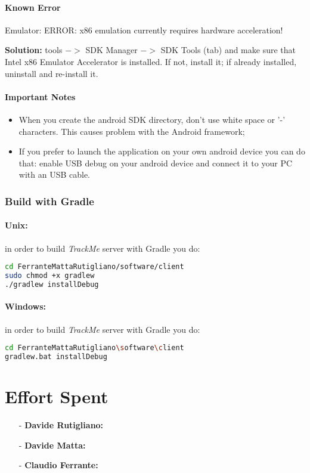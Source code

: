 \documentclass[a4paper]{article}
\begin{document}
\paragraph{Known Error}
Emulator: ERROR: x86 emulation currently requires hardware acceleration!

\textbf{Solution:} tools ${->}$ SDK Manager ${->}$ SDK Tools (tab) and make sure that Intel x86 Emulator Accelerator is installed. If not, install it; if already installed, uninstall and re-install it.

\paragraph{Important Notes}
\begin{itemize}
    \item When you create the android SDK directory, don't use white space or '-' characters. This causes problem with the Android framework;
    \item If you prefer to launch the application on your own android device you can do that: enable USB debug on your android device and connect it to your PC with an USB cable.
\end{itemize}

\subsubsection{Build with Gradle}

\paragraph{Unix:} in order to build \textit{TrackMe} server with Gradle you do:

\begin{lstlisting}[language=bash]
cd FerranteMattaRutigliano/software/client
sudo chmod +x gradlew
./gradlew installDebug
\end{lstlisting}

\paragraph{Windows:} in order to build \textit{TrackMe} server with Gradle you do:

\begin{lstlisting}[language=bash]
cd FerranteMattaRutigliano\software\client
gradlew.bat installDebug
\end{lstlisting}

\newpage
\section{Effort Spent}
    \begin{itemize}
        \item[-] \textbf{Davide Rutigliano: }
        
        \item[-] \textbf{Davide Matta: }
        
        \item[-] \textbf{Claudio Ferrante: }
    \end{itemize}
\end{document}
